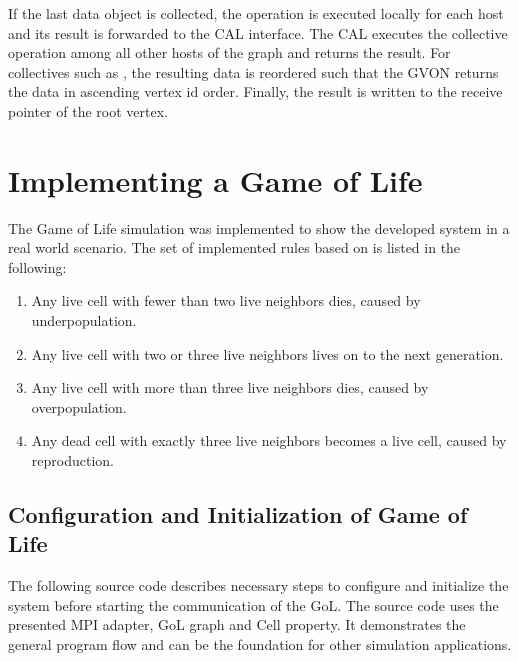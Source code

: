 \noindent If the last data object is collected, the
operation is executed locally for each host and its result is forwarded to the CAL
interface. The CAL executes the collective operation among all
other hosts of the graph and returns the result. For collectives such as
, the resulting data is reordered such that the GVON returns the
data in ascending vertex id order. Finally, the result is written to the receive
pointer of the root vertex.



\section{Implementing a Game of Life}
\label{sec:impl:gol}
The Game of Life simulation was implemented to show the developed
system in a real world scenario. The set of implemented rules based on
\cite{ref:gol_rules} is listed in the following:

\begin{enumerate}
\item Any live cell with fewer than two live neighbors dies, caused by underpopulation.
\item Any live cell with two or three live neighbors lives on to the next generation.
\item Any live cell with more than three live neighbors dies, caused by overpopulation.
\item Any dead cell with exactly three live neighbors becomes a live cell, caused by reproduction.
\end{enumerate}

\subsection{Configuration and Initialization of Game of Life}
The following source code describes necessary steps to configure and
initialize the system before starting the communication of the
GoL. The source code uses the presented MPI adapter, GoL graph and
Cell property. It demonstrates the general program flow and can be the
foundation for other simulation applications.

